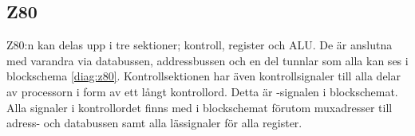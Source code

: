 \documentclass[main.tex]{subfiles}
\begin{document}
\subsection{Z80}
Z80:n kan delas upp i tre sektioner; kontroll, register och ALU. De är anslutna
med varandra via databussen, addressbussen och en del tunnlar som alla kan ses
i blockschema \ref{diag:z80}. Kontrollsektionen har även kontrollsignaler till
alla delar av processorn i form av ett långt kontrollord. Detta är
-signalen i blockschemat. Alla signaler i kontrollordet finns med i
blockschemat förutom muxadresser till adress- och databussen samt alla
lässignaler för alla register.




\end{document}
